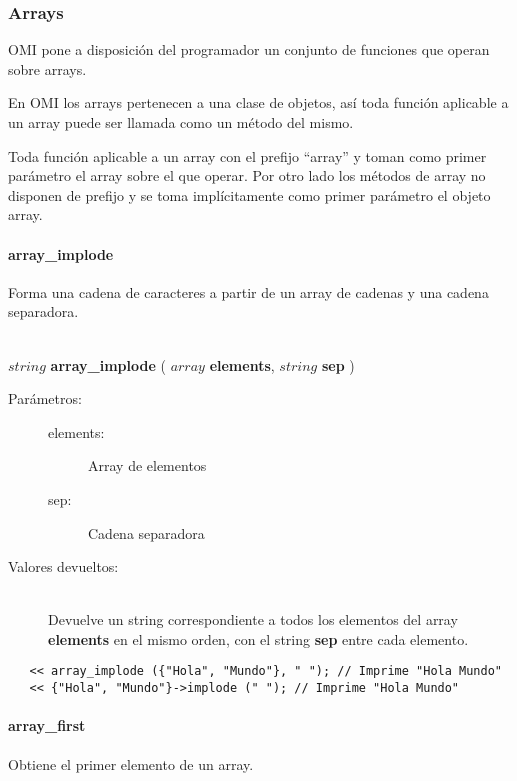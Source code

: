 \subsubsection{Arrays}
OMI pone a disposición del programador un conjunto de funciones que operan sobre arrays.

En OMI los arrays pertenecen a una clase de objetos, así toda función aplicable a un array
puede ser llamada como un método del mismo. 

Toda función aplicable a un array con el prefijo ``array'' y toman como primer parámetro el array sobre el que 
operar. Por otro lado los métodos de array no disponen de prefijo y se toma implícitamente como primer parámetro el objeto 
array.

\paragraph{array\_implode}
Forma una cadena de caracteres a partir de un array de cadenas y una cadena separadora. 

\begin{framed}
\hfill \\ $string$ \textbf{array\_implode} ( $array$ \textbf{elements}, $string$ \textbf{sep} )  
\begin{description}
\item [Parámetros:] \hfill 
   \begin{description}
   \item[elements:] Array de elementos
   \item[sep:] Cadena separadora
   \end{description}
\item[Valores devueltos:] \hfill \\
   Devuelve un string correspondiente a todos los elementos del array \textbf{elements} en el mismo orden, con el string \textbf{sep} entre cada elemento. 
\end{description}
\end{framed}
     
\begin{lstlisting}   
   << array_implode ({"Hola", "Mundo"}, " "); // Imprime "Hola Mundo"
   << {"Hola", "Mundo"}->implode (" "); // Imprime "Hola Mundo"
\end{lstlisting}

\paragraph{array\_first}
Obtiene el primer elemento de un array. 


